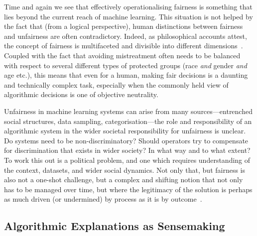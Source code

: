\documentclass[sigchi-a, authorversion]{acmart}
\begin{document}
Time and again we see that effectively operationalising fairness is something that lies beyond the current reach of machine learning. This situation is not helped by the fact that (from a logical perspective), human distinctions between fairness and unfairness are often contradictory. Indeed, as philosophical accounts attest, the concept of fairness is multifaceted and divisible into different dimensions~\cite{binns2017fairness}. Coupled with the fact that avoiding mistreatment often needs to be balanced with respect to several different types of protected groups (race \textit{and} gender \textit{and} age etc.), this means that even for a human, making fair decisions is a daunting and technically complex task, especially when the commonly held view of algorithmic decisions is one of objective neutrality. 

Unfairness in machine learning systems can arise from many sources---entrenched social structures, data sampling, categorisation---the role and responsibility of an algorithmic system in the wider societal responsibility for unfairness is unclear. Do systems need to be non-discriminatory? Should operators try to compensate for discrimination that exists in wider society? In what way and to what extent? To work this out is a political problem, and one which requires understanding of the context, datasets, and wider social dynamics. Not only that, but fairness is also not a one-shot challenge, but a complex and shifting notion that not only has to be managed over time, but where the legitimacy of the solution is perhaps as much driven (or undermined) by process as it is by outcome~\cite{Pasquale:2014vt}.


\subsection{Algorithmic Explanations as Sensemaking}
\end{document}
